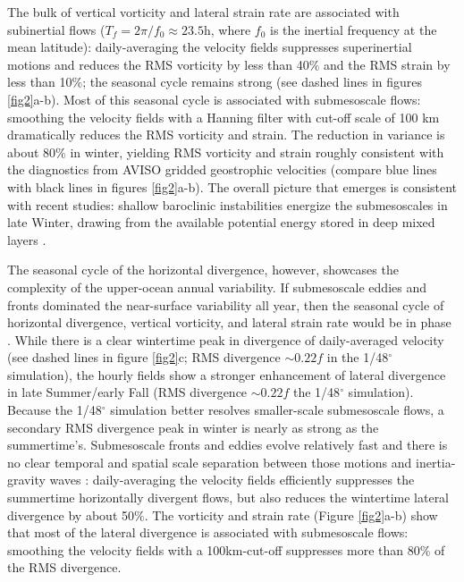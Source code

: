 \documentclass[grl]{agutex2015}
\begin{document}
\begin{article}
The bulk of vertical vorticity and lateral strain rate are associated with subinertial flows
($T_f = 2\pi/f_0\approx 23.5$h, where $f_0$ is the inertial frequency at
the mean latitude): daily-averaging the velocity fields suppresses superinertial
motions and reduces the RMS
vorticity by less than 40$\%$ and the RMS strain by less than 10$\%$; the seasonal
cycle remains strong (see
dashed lines in figures \ref{fig2}a-b). Most of this seasonal cycle is associated
with submesoscale flows: smoothing the velocity fields
with a Hanning filter with cut-off scale of 100 km dramatically reduces the RMS
vorticity and strain. The reduction in variance is about 80$\%$ in winter,
yielding RMS vorticity and strain roughly consistent with the diagnostics from
AVISO gridded geostrophic velocities (compare blue lines with black lines in figures \ref{fig2}a-b).
The overall picture that emerges is consistent with recent studies: shallow baroclinic
instabilities energize the submesoscales in late Winter, drawing from the available
potential energy stored in deep mixed layers \citep{sasaki_etal2014,callies_etal2015,callies_etal2016}.

The seasonal cycle of the horizontal divergence, however, showcases the complexity
of the upper-ocean annual variability. If submesoscale eddies and fronts dominated
the near-surface variability all year, then the seasonal cycle of horizontal divergence,
vertical vorticity, and lateral strain rate would be in phase \citep[e.g.,][]{sasaki_etal2014}.
While there is a clear wintertime peak in divergence of daily-averaged velocity
(see dashed lines in figure \ref{fig2}c; RMS divergence $\sim0.22 f$ in the 1/48$^\circ$
simulation), the hourly fields show
a stronger enhancement of
lateral divergence in late Summer/early Fall (RMS divergence $\sim0.22 f$ the 1/48$^\circ$
simulation). Because the 1/48$^\circ$ simulation better resolves
smaller-scale submesoscale flows, a secondary RMS divergence peak in winter  is
nearly as strong as the summertime's. Submesoscale fronts and eddies evolve
relatively fast and there is no clear
temporal and spatial scale separation between those motions and inertia-gravity waves
\citep{mcwilliams2016}:
daily-averaging the velocity fields efficiently suppresses the summertime horizontally
divergent flows, but also reduces the wintertime lateral divergence by about 50$\%$.
The vorticity and strain rate (Figure \ref{fig2}a-b) show that most of the lateral divergence is associated
with submesoscale flows: smoothing the velocity fields with a 100km-cut-off
suppresses more than 80$\%$ of the RMS divergence.


\end{article}
\end{document}
